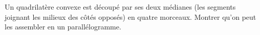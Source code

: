 Un quadrilatère convexe est découpé par ses deux médianes (les segments joignant les milieux des côtés opposés) en quatre morceaux. Montrer qu'on peut les assembler en un parallélogramme.
